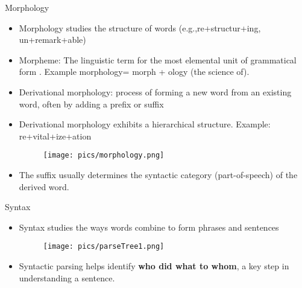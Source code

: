 \documentclass[handout]{beamer}
\begin{document}
\begin{frame}{Morphology}
\scriptsize{


\begin{itemize}
\item Morphology studies the structure of words (e.g.,re+structur+ing, un+remark+able) \cite{JohnsonMLSS}  
\item Morpheme: The linguistic term for the most elemental unit of grammatical form \cite{fromkin2018introduction}. Example morphology= morph + ology (the science of).
\item Derivational morphology: process of forming a new word from an existing word, often by adding a prefix or suffix 
\item Derivational morphology exhibits a hierarchical structure. Example: re+vital+ize+ation
     \begin{figure}[h]
        	\texttt{[image: pics/morphology.png]}
        \end{figure}
\item The suffix usually determines the syntactic category (part-of-speech) of the derived word.        
\end{itemize}

}


\end{frame}



\begin{frame}{Syntax}
\scriptsize{
\begin{itemize}
\item Syntax studies the ways words combine to form phrases and sentences \cite{JohnsonMLSS}
     \begin{figure}[h]
        	\texttt{[image: pics/parseTree1.png]}
        \end{figure}
\item Syntactic parsing helps identify \textbf{who did what to whom}, a key step in
understanding a sentence.       
\end{itemize}

}


\end{frame}
\end{document}
